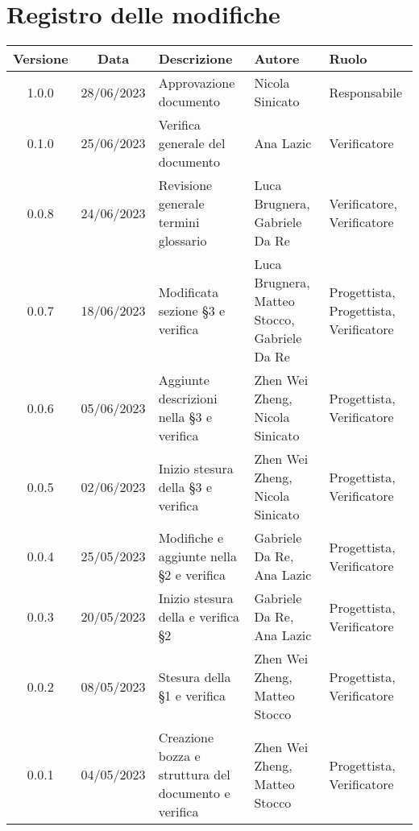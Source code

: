 \section*{Registro delle modifiche}
\begin{center}
\setlength\extrarowheight{5pt}
\renewcommand\tabularxcolumn[1]{>{\Centering}m{#1}}
\begin{tabularx}{\textwidth}{| c | c | X | X | X |} 
	\hline
	\rowcolor{white}
	\textbf{Versione} & \textbf{Data} & \textbf{Descrizione} & \textbf{Autore} & \textbf{Ruolo}\\
	\hline
	1.0.0 & 28/06/2023 & Approvazione documento & Nicola Sinicato & Responsabile \\
	\hline
	0.1.0 & 25/06/2023 & Verifica generale del documento& Ana Lazic & Verificatore\\
	\hline
	0.0.8 & 24/06/2023 & Revisione generale termini glossario & Luca Brugnera, Gabriele Da Re & Verificatore, Verificatore\\
	\hline
	0.0.7 & 18/06/2023 & Modificata sezione §3 e verifica& Luca Brugnera, Matteo Stocco, Gabriele Da Re & Progettista, Progettista, Verificatore\\
	\hline
	0.0.6 & 05/06/2023 & Aggiunte descrizioni nella §3 e verifica& Zhen Wei Zheng, Nicola Sinicato & Progettista, Verificatore\\
	\hline
	0.0.5 & 02/06/2023 & Inizio stesura della §3 e verifica& Zhen Wei Zheng, Nicola Sinicato & Progettista, Verificatore\\
	\hline
	0.0.4 & 25/05/2023 & Modifiche e aggiunte nella §2 e verifica & Gabriele Da Re, Ana Lazic & Progettista, Verificatore\\
	\hline
	0.0.3 & 20/05/2023 & Inizio stesura della e verifica §2 & Gabriele Da Re, Ana Lazic & Progettista, Verificatore\\
	\hline
	0.0.2 & 08/05/2023 & Stesura della §1 e verifica & Zhen Wei Zheng, Matteo Stocco & Progettista, Verificatore\\
	\hline
	0.0.1 & 04/05/2023 & Creazione bozza e struttura del documento e verifica& Zhen Wei Zheng, Matteo Stocco & Progettista, Verificatore\\
	\hline
	\end{tabularx}
\end{center}
